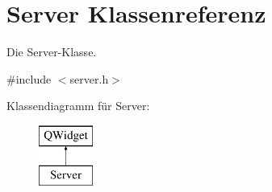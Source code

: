 \hypertarget{class_server}{}\section{Server Klassenreferenz}
\label{class_server}


Die Server-\/\+Klasse.  




{\ttfamily \#include $<$server.\+h$>$}

Klassendiagramm für Server\+:\begin{figure}[H]
\begin{center}
\leavevmode
\includegraphics[height=2.000000cm]{class_server}
\end{center}
\end{figure}
